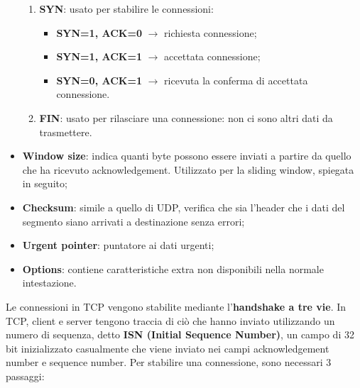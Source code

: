 \begin{itemize}
\begin{enumerate}
                    \item \textbf{SYN}: usato per stabilire le connessioni:
                        \begin{itemize}
                            \item \textbf{SYN=1, ACK=0} $\rightarrow$ richiesta connessione;
                            \item \textbf{SYN=1, ACK=1} $\rightarrow$ accettata connessione;
                            \item \textbf{SYN=0, ACK=1} $\rightarrow$ ricevuta la conferma di accettata connessione.
                        \end{itemize}
                    \item \textbf{FIN}: usato per rilasciare una connessione: non ci sono altri dati da trasmettere.
                \end{enumerate}
            \item \textbf{Window size}: indica quanti byte possono essere inviati a partire da quello che ha
            ricevuto acknowledgement. Utilizzato per la sliding window, spiegata in seguito;
            \item \textbf{Checksum}: simile a quello di UDP, verifica che sia l’header che i dati del segmento siano
            arrivati a destinazione senza errori;
            \item \textbf{Urgent pointer}: puntatore ai dati urgenti;
            \item \textbf{Options}: contiene caratteristiche extra non disponibili nella normale intestazione.
                
        \end{itemize}
        Le connessioni in TCP vengono stabilite mediante l’\textbf{handshake a tre vie}. In TCP, client e server
        tengono traccia di ciò che hanno inviato utilizzando un numero di sequenza, detto \textbf{ISN (Initial
        Sequence Number)}, un campo di 32 bit inizializzato casualmente che viene inviato nei campi
        acknowledgement number e sequence number.
        Per stabilire una connessione, sono necessari 3 passaggi:
